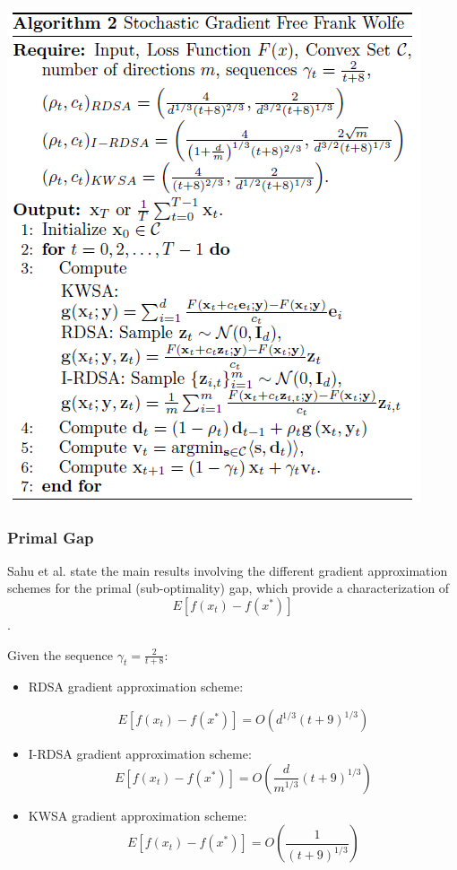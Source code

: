 \documentclass[10pt,twocolumn,letterpaper]{article}
\begin{document}
\begin{center}
   \includegraphics*[scale=0.75]{img/sgffw_pseudocode.png}
\end{center}

\subsubsection{Primal Gap}

Sahu et al.\cite{Sahu} state the main results involving the different gradient 
approximation schemes for the primal (sub-optimality) gap, which provide a characterization of
\[E\left[f\left(x_{t}\right)-f\left(x^{*}\right)\right]\].

Given the sequence $\gamma_{t}= \frac{2}{t+8}$:

\begin{itemize}
   \item{RDSA gradient approximation scheme:

         \[
         E\left[f\left(x_{t}\right)-f\left(x^{*}\right)\right]=O\left(d^{1 / 3}(t+9)^{1 / 3}\right)
         \]
   }

   \item{I-RDSA gradient approximation scheme:
         \[
         E\left[f\left(x_{t}\right)-f\left(x^{*}\right)\right]=O\left(\frac{d}{m^{1 / 3}}(t+9)^{1 / 3}\right)
         \]
   }

   \item{KWSA gradient approximation scheme:
         \[
         E\left[f\left(x_{t}\right)-f\left(x^{*}\right)\right]=O\left(\frac{1}{(t+9)^{1 / 3}}\right)
         \]
   }
\end{itemize}
\end{document}
